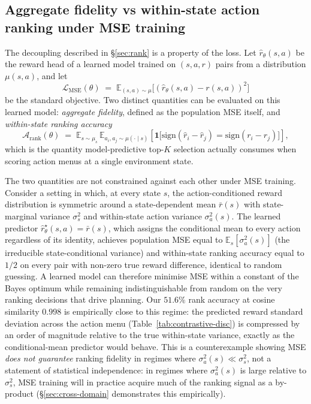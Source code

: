 \documentclass[11pt]{article}
\begin{document}
\subsection*{Aggregate fidelity vs within-state action ranking under MSE training}\label{sec:methods-fidelity-vs-ranking}

The decoupling described in \S\ref{sec:rank} is a property of the loss. Let $\hat{r}_\theta(s, a)$ be the reward head of a learned model trained on $(s, a, r)$ pairs from a distribution $\mu(s, a)$, and let
\begin{equation}
\mathcal{L}_{\text{MSE}}(\theta) \;=\; \mathbb{E}_{(s,a)\sim\mu}\big[(\hat{r}_\theta(s,a) - r(s,a))^2\big]
\end{equation}
be the standard objective. Two distinct quantities can be evaluated on this learned model: \emph{aggregate fidelity}, defined as the population MSE itself, and \emph{within-state ranking accuracy}
\begin{equation}
\mathcal{A}_{\text{rank}}(\theta) \;=\; \mathbb{E}_{s\sim\mu_s}\,\mathbb{E}_{a_i,a_j\sim\mu(\cdot \mid s)}\!\left[\mathbf{1}\big[\mathrm{sign}(\hat{r}_i - \hat{r}_j) = \mathrm{sign}(r_i - r_j)\big]\right],
\end{equation}
which is the quantity model-predictive top-$K$ selection actually consumes when scoring action menus at a single environment state.

The two quantities are not constrained against each other under MSE training. Consider a setting in which, at every state $s$, the action-conditioned reward distribution is symmetric around a state-dependent mean $\bar{r}(s)$ with state-marginal variance $\sigma_s^2$ and within-state action variance $\sigma_a^2(s)$. The learned predictor $\hat{r}_\theta^{\star}(s,a) = \bar{r}(s)$, which assigns the conditional mean to every action regardless of its identity, achieves population MSE equal to $\mathbb{E}_s[\sigma_a^2(s)]$ (the irreducible state-conditional variance) and within-state ranking accuracy equal to $1/2$ on every pair with non-zero true reward difference, identical to random guessing. A learned model can therefore minimise MSE within a constant of the Bayes optimum while remaining indistinguishable from random on the very ranking decisions that drive planning. Our $51.6\%$ rank accuracy at cosine similarity $0.998$ is empirically close to this regime: the predicted reward standard deviation across the action menu (Table~\ref{tab:contrastive-disc}) is compressed by an order of magnitude relative to the true within-state variance, exactly as the conditional-mean predictor would behave. This is a counterexample showing MSE \emph{does not guarantee} ranking fidelity in regimes where $\sigma_a^2(s) \ll \sigma_s^2$, not a statement of statistical independence: in regimes where $\sigma_a^2(s)$ is large relative to $\sigma_s^2$, MSE training will in practice acquire much of the ranking signal as a by-product (\S\ref{sec:cross-domain} demonstrates this empirically).
\end{document}

